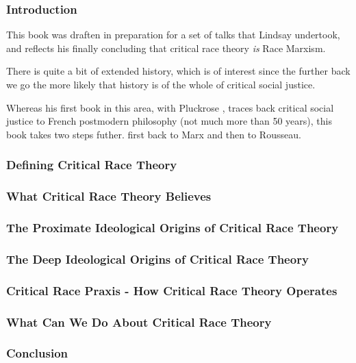 \documentclass[10pt,titlepage]{book}
\begin{document}
\subsubsection{Introduction}

This book was draften in preparation for a set of talks that Lindsay undertook, and reflects his finally concluding that critical race theory \emph{is} Race Marxism.

There is quite a bit of extended history, which is of interest since the further back we go the more likely that history is of the whole of critical social justice.

Whereas his first book in this area, with Pluckrose \cite{pluckrose-cynical}, traces back critical social justice to French postmodern philosophy (not much more than 50 years), this book takes two steps futher. first back to Marx and then to Rousseau.

\subsubsection{Defining Critical Race Theory}

\subsubsection{What Critical Race Theory Believes}

\subsubsection{The Proximate Ideological Origins of Critical Race Theory}

\subsubsection{The Deep Ideological Origins of Critical Race Theory}

\subsubsection{Critical Race Praxis - How Critical Race Theory Operates}

\subsubsection{What Can We Do About Critical Race Theory}

\subsubsection{Conclusion}
\end{document}
